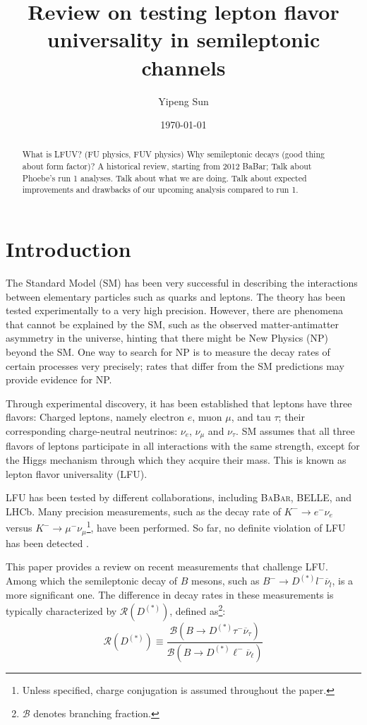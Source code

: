 \documentclass[12pt,letterpaper]{article}
\title{Review on testing lepton flavor universality in semileptonic channels}
\author{Yipeng Sun}
\affil{Department of Physics, University of Maryland}
\date{\today}
\def\BaBar/{\textsc{BaBar}}
\def\RDDst/{\ensuremath{\mathcal{R}(D^{(*)})}}
\begin{document}
\maketitle

\begin{abstract}
    What is LFUV? (FU physics, FUV physics)
    Why semileptonic decays (good thing about form factor)?
    A historical review, starting from 2012 BaBar;
    Talk about Phoebe's run 1 analyses.
    Talk about what we are doing.
    Talk about expected improvements and drawbacks of our upcoming analysis compared
    to run 1.
\end{abstract}

\section{Introduction}
The Standard Model (SM) has been very successful in describing the interactions
between elementary particles such as quarks and leptons.
The theory has been tested experimentally to a very high precision.
However, there are phenomena that cannot be explained by the SM, such as
the observed matter-antimatter asymmetry in the universe, hinting that there might be New Physics (NP) beyond the SM.
One way to search for NP is to measure the decay rates of certain processes
very precisely;
rates that differ from the SM predictions may provide evidence for NP.

Through experimental discovery, it has been established that leptons have three
flavors:
Charged leptons, namely electron $e$, muon $\mu$, and tau $\tau$;
their corresponding charge-neutral neutrinos: $\nu_e$, $\nu_\mu$ and $\nu_\tau$.
SM assumes that all three flavors of leptons participate in all
interactions with the same strength, except for the Higgs mechanism through which
they acquire their mass.
This is known as lepton flavor universality (LFU).

LFU has been tested by different collaborations, including \BaBar/, BELLE, and LHCb.
Many precision measurements, such as the decay rate
of $K^- \rightarrow e^- \nu_e$ versus $K^- \rightarrow \mu^- \nu_\mu$\footnote{
    Unless specified, charge conjugation is assumed throughout the paper.
}, have been performed.
So far, no definite violation of LFU has been detected \cite{Ciezarek:2017yzh}.

This paper provides a review on recent measurements that challenge LFU.
Among which the semileptonic decay of $B$ mesons, such as 
$B^- \rightarrow D^{(*)} l^- \overline{\nu}_l$, is a more significant one.
The difference in decay rates in these measurements is typically characterized by \RDDst/, 
defined as\footnote{
    $\mathcal{B}$ denotes branching fraction.
}:
\begin{equation}
    \RDDst/ \equiv \frac{
        \mathcal{B}\left(
            B \rightarrow D^{(*)} \tau^- \overline{\nu}_\tau
        \right)
    }{
        \mathcal{B}\left(
            B \rightarrow D^{(*)} \ell^- \overline{\nu}_\ell
        \right)
    }
\end{equation}
\end{document}
